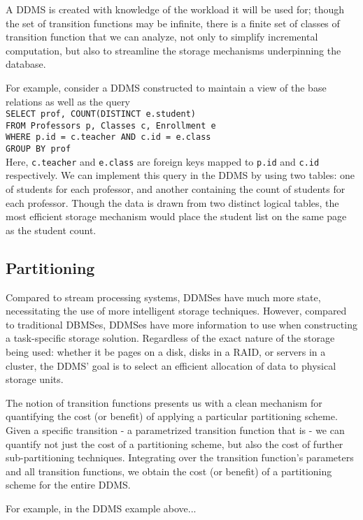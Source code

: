 A DDMS is created with knowledge of the workload it will be used for; though the set of transition functions may be infinite, there is a finite set of classes of transition function that we can analyze, not only to simplify incremental computation, but also to streamline the storage mechanisms underpinning the database.

For example, consider a DDMS constructed to maintain a view of the base relations as well as the query\texttt{\\
SELECT prof, COUNT(DISTINCT e.student)\\
FROM Professors p, Classes c, Enrollment e\\
WHERE p.id = c.teacher AND c.id = e.class\\
GROUP BY prof\\
}
Here, \texttt{c.teacher} and \texttt{e.class} are foreign keys mapped to \texttt{p.id} and \texttt{c.id} respectively.  We can implement this query in the DDMS by using two tables: one of students for each professor, and another containing the count of students for each professor.  Though the data is drawn from two distinct logical tables, the most efficient storage mechanism would place the student list on the same page as the student count.

\subsection{Partitioning}
Compared to stream processing systems, DDMSes have much more state, necessitating the use of more intelligent storage techniques.  However, compared to traditional DBMSes, DDMSes have more information to use when constructing a task-specific storage solution.  Regardless of the exact nature of the storage being used: whether it be pages on a disk, disks in a RAID, or servers in a cluster, the DDMS' goal is to select an efficient allocation of data to physical storage units.

The notion of transition functions presents us with a clean mechanism for quantifying the cost (or benefit) of applying a particular partitioning scheme.  Given a specific transition - a parametrized transition function that is - we can quantify not just the cost of a partitioning scheme, but also the cost of further sub-partitioning techniques.  Integrating over the transition function's parameters and all transition functions, we obtain the cost (or benefit) of a partitioning scheme for the entire DDMS.  

For example, in the DDMS example above...

